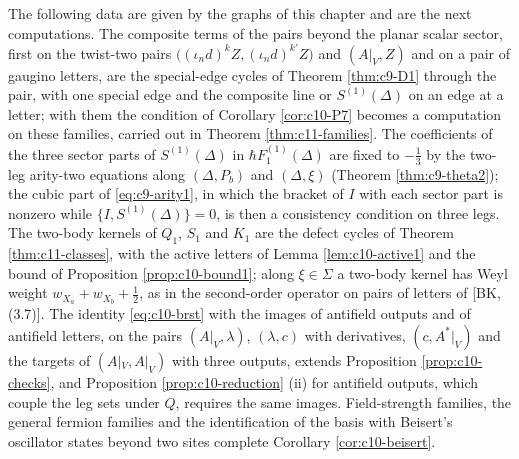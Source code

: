 \begin{remark}
\label{rem:c10-next}
The following data are given by the graphs of this chapter and are the next computations. The composite terms of the pairs beyond the planar scalar sector, first on the twist-two pairs $\big((\iota_nd)^kZ,(\iota_nd)^{k'}Z\big)$ and $(A|_V,Z)$ and on a pair of gaugino letters, are the special-edge cycles of Theorem \ref{thm:c9-D1} through the pair, with one special edge and the composite line or $S^{(1)}(\Delta)$ on an edge at a letter; with them the condition of Corollary \ref{cor:c10-P7} becomes a computation on these families, carried out in Theorem \ref{thm:c11-families}. The coefficients of the three sector parts of $S^{(1)}(\Delta)$ in $\hbar F_1^{(1)}(\Delta)$ are fixed to $-\tfrac13$ by the two-leg arity-two equations along $(\Delta,P_b)$ and $(\Delta,\xi)$ (Theorem \ref{thm:c9-theta2}); the cubic part of \eqref{eq:c9-arity1}, in which the bracket of $I$ with each sector part is nonzero while $\{I,S^{(1)}(\Delta)\}=0$, is then a consistency condition on three legs. The two-body kernels of $Q_1$, $S_1$ and $K_1$ are the defect cycles of Theorem \ref{thm:c11-classes}, with the active letters of Lemma \ref{lem:c10-active1} and the bound of Proposition \ref{prop:c10-bound1}; along $\xi\in\Sigma$ a two-body kernel has Weyl weight $w_{X_a}+w_{X_b}+\tfrac12$, as in the second-order operator on pairs of letters of [BK, (3.7)]. The identity \eqref{eq:c10-brst} with the images of antifield outputs and of antifield letters, on the pairs $(A|_V,\lambda)$, $(\lambda,c)$ with derivatives, $(c,A^*|_V)$ and the targets of $(A|_V,A|_V)$ with three outputs, extends Proposition \ref{prop:c10-checks}, and Proposition \ref{prop:c10-reduction} (ii) for antifield outputs, which couple the leg sets under $Q$, requires the same images. Field-strength families, the general fermion families and the identification of the basis with Beisert's oscillator states beyond two sites complete Corollary \ref{cor:c10-beisert}.
\end{remark}

